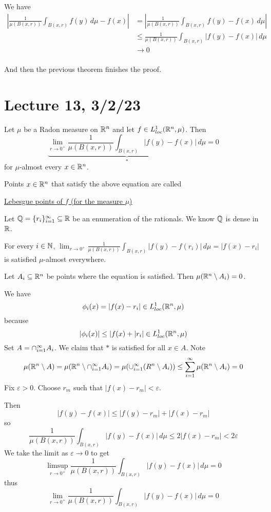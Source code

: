 \documentclass[x11names,reqno,14pt]{extarticle}
\newcommand{\seq}[2][\oo]{_{#2 = 1}^#1}
\newcommand{\cupi}[1][\oo]{\cup\seq[#1]{i}}
\newcommand{\capi}[1][\oo]{\cap\seq[#1]{i}}
\newcommand{\loc}{loc}
\begin{document}
\proof

We have
\begin{align*}
|\frac{1}{\mu(B(x, r))}\int_{B(x, r)}f(y)\,d\mu - f(x)| & = |\frac{1}{\mu(B(x, r))}\int_{B(x, r)}f(y) - f(x)\,d\mu| \\
& \leq \frac{1}{\mu(B(x, r))}\int_{B(x, r)}|f(y) - f(x)|\,d\mu \\
& \to 0 \\
\end{align*}

And then the previous theorem finishes the proof. 

\section*{Lecture 13, 3/2/23}

\thm Let $\mu$ be a Radon measure on $\mathbb{R}^n$ and let $f \in L^1_{\loc}(\R^n,\mu)$. Then 
\[
\underbrace{\lim_{r\to0^+}\frac{1}{\mu(B(x, r))}\int_{B(x, r)}|f(y) - f(x)|\,d\mu}_{*} = 0
\]
for $\mu$-almost every $x \in \mathbb{R}^n$. 

 Points $x\in\mathbb{R}^n$ that satisfy the above equation are called 

\underline{Lebesgue points of $f$ (for the measure $\mu$)}

\proof

Let $\Q = \{r_i\}\seq{i}\subseteq\R$ be an enumeration of the rationals. We know $\mathbb{Q}$ is dense in $\mathbb{R}$. 

For every $i \in \mathbb{N}$, $\lim_{r\to0^+}\frac{1}{\mu(B(x, r))}\int_{B(x, r)}|f(y) - f(r_i)|\,d\mu = |f(x) - r_i|$ is satisfied $\mu$-almost everywhere. 

Let $A_i\subseteq \mathbb{R}^n$ be points where the equation is satisfied. Then $\mu(\mathbb{R}^n\setminus A_i) = 0$. 

We have 
\[
\phi_i(x) = |f(x) - r_i|\in L^1_{\loc}(\R^n,\mu)
\]
because 
\[
|\phi_i(x)| \leq |f(x) + |r_i| \in L^1_{\loc}(\R^n,\mu)
\]
Set $A = \capi A_i$. We claim that $*$ is satisfied for all $x \in A$. Note
\[
\mu(\R^n\setminus A) = \mu(\R^n\setminus\capi A_i) = \mu(\cupi (R^n\setminus A_i)) \leq \sum\seq{i}\mu(\R^n\setminus A_i) = 0
\]
Fix $\varepsilon > 0$. Choose $r_m$ such that $|f(x) - r_m| < \varepsilon$. 

Then 
\[
|f(y) - f(x)| \leq |f(y) - r_m| + |f(x) - r_m|
\]
so
\[
\frac{1}{\mu(B(x, r))}\int_{B(x, r)}|f(y) - f(x)|\,d\mu \leq 2|f(x) - r_m| < 2\varepsilon
\]
We take the limit as $\varepsilon\to0$ to get
\[
\limsup_{r\to0^+}\frac{1}{\mu(B(x, r))}\int_{B(x, r)}|f(y) - f(x)|\,d\mu = 0
\]
thus
\[
\lim_{r\to0^+}\frac{1}{\mu(B(x, r))}\int_{B(x, r)}|f(y) - f(x)|\,d\mu =0
\]
\end{document}
